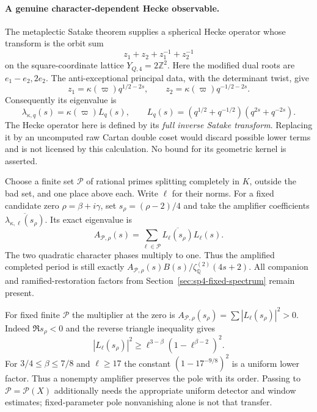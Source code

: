 \paragraph{A genuine character-dependent Hecke observable.}
The metaplectic Satake theorem \cite{McNamaraSatake} supplies a spherical
Hecke operator whose transform is the orbit sum
\[
 z_1+z_2+z_1^{-1}+z_2^{-1}
\]
on the square-coordinate lattice \(Y_{Q,4}=2\mathbb Z^2\).
Here the modified dual roots are \(e_1-e_2,2e_2\).
The anti-exceptional principal data, with the determinant twist, give
\[
 z_1=\kappa(\varpi)q^{1/2-2s},\qquad
 z_2=\kappa(\varpi)q^{-1/2-2s}.
\]
Consequently its eigenvalue is
\begin{equation}\label{eq:sp4-character-hecke-eigenvalue}
 \lambda_{\kappa,q}(s)=\kappa(\varpi)L_q(s),\qquad
 L_q(s)=(q^{1/2}+q^{-1/2})(q^{2s}+q^{-2s}).
\end{equation}
The Hecke operator here is defined by its \emph{full inverse Satake
transform}. Replacing it by an uncomputed raw Cartan double coset
would discard possible lower terms and is not licensed by this
calculation. No bound for its geometric kernel is asserted.

Choose a finite set \(\mathcal P\) of rational primes splitting
completely in \(K\), outside the bad set, and one place above each.
Write \(\ell\) for their norms. For a fixed candidate zero
\(\rho=\beta+i\gamma\), set \(s_\rho=(\rho-2)/4\) and take the
amplifier coefficients
\(\overline{\lambda_{\kappa,\ell}(s_\rho)}\).
Its exact eigenvalue is
\begin{equation}\label{eq:sp4-full-hecke-amplifier}
 A_{\mathcal P,\rho}(s)
 =\sum_{\ell\in\mathcal P}\overline{L_\ell(s_\rho)}L_\ell(s).
\end{equation}
The two quadratic character phases multiply to one. Thus the
amplified completed period is still exactly
\(A_{\mathcal P,\rho}(s)B(s)/\zeta_{\mathbb Q}^{(2)}(4s+2)\).
All companion and ramified-restoration factors from
Section~\ref{sec:sp4-fixed-spectrum} remain present.

For fixed finite \(\mathcal P\) the multiplier at the zero is
\(A_{\mathcal P,\rho}(s_\rho)=\sum|L_\ell(s_\rho)|^2>0\).
Indeed \(\Re s_\rho<0\) and the reverse triangle inequality gives
\[
 |L_\ell(s_\rho)|^2
 \ge \ell^{3-\beta}(1-\ell^{\beta-2})^2.
\]
For \(3/4\le\beta\le7/8\) and \(\ell\ge17\) the constant
\((1-17^{-9/8})^2\) is a uniform lower factor. Thus a nonempty
amplifier preserves the pole with its order. Passing to
\(\mathcal P=\mathcal P(X)\) additionally needs the appropriate
uniform detector and window estimates; fixed-parameter pole
nonvanishing alone is not that transfer.

